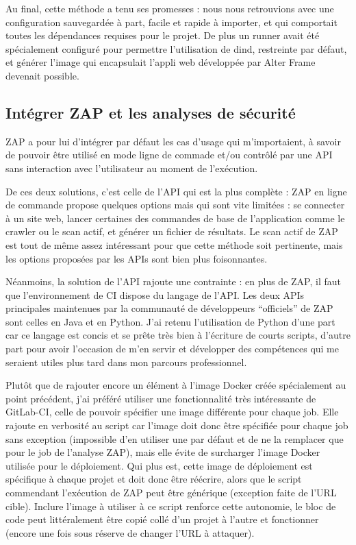 
Au final, cette méthode a tenu ses promesses : nous nous retrouvions avec une configuration sauvegardée à part, facile et rapide à importer, et qui comportait toutes les dépendances requises pour le projet. De plus un runner avait été spécialement configuré pour permettre l'utilisation de dind, restreinte par défaut, et générer l'image qui encapsulait l'appli web développée par Alter Frame devenait possible.

\subsection{Intégrer ZAP et les analyses de sécurité}
ZAP a pour lui d'intégrer par défaut les cas d'usage qui m'importaient, à savoir de pouvoir être utilisé en mode ligne de commade et/ou contrôlé par une API sans interaction avec l'utilisateur au moment de l'exécution.

De ces deux solutions, c'est celle de l'API qui est la plus complète : ZAP en ligne de commande propose quelques options
mais qui sont vite limitées : se connecter à un site web, lancer certaines des commandes de base de l'application comme le crawler ou le scan actif, et générer un fichier de résultats. Le scan actif de ZAP est tout de même assez intéressant pour que cette méthode soit pertinente, mais les options proposées par les APIs sont bien plus foisonnantes.

Néanmoins, la solution de l'API rajoute une contrainte : en plus de ZAP, il faut que l'environnement de CI dispose du langage de l'API. Les deux APIs principales maintenues par la communauté de développeurs ``officiels'' de ZAP sont celles en Java et en Python. J'ai retenu l'utilisation de Python d'une part car ce langage est concis et se prête très bien à l'écriture de courts scripts, d'autre part pour avoir l'occasion de m'en servir et développer des compétences qui me seraient utiles plus tard dans mon parcours professionnel.

Plutôt que de rajouter encore un élément à l'image Docker créée spécialement au point précédent, j'ai préféré utiliser une fonctionnalité très intéressante de GitLab-CI, celle de pouvoir spécifier une image différente pour chaque job. Elle rajoute en verbosité au script car l'image doit donc être spécifiée pour chaque job sans exception (impossible d'en utiliser une par défaut et de ne la remplacer que pour le job de l'analyse ZAP), mais elle évite de surcharger l'image Docker utilisée pour le déploiement. Qui plus est, cette image de déploiement est spécifique à chaque projet et doit donc être réécrire, alors que le script commendant l'exécution de ZAP peut être générique (exception faite de l'URL cible). Inclure l'image à utiliser à ce script renforce cette autonomie, le bloc de code peut littéralement être copié collé d'un projet à l'autre et fonctionner (encore une fois sous réserve de changer l'URL à attaquer).

